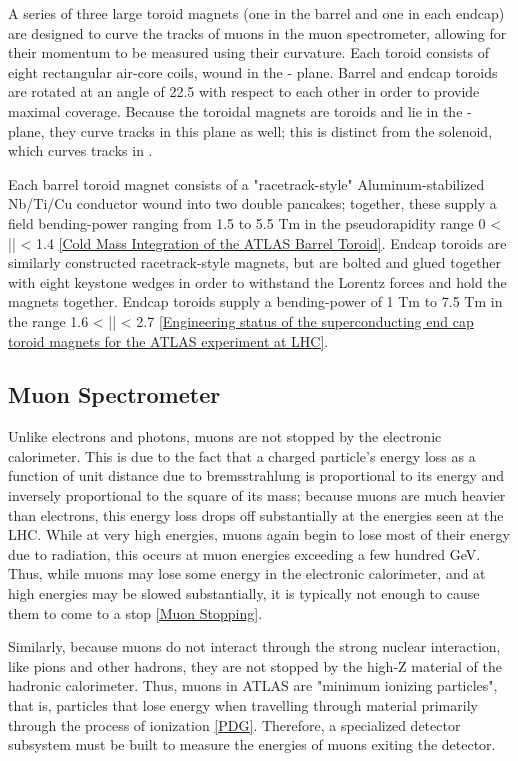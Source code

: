 A series of three large toroid magnets (one in the barrel and one in each endcap) are designed to curve the tracks of muons in the muon spectrometer, allowing for their momentum to be measured using their curvature. Each toroid consists of eight rectangular air-core coils, wound in the \R - \z plane. Barrel and endcap toroids are rotated at an angle of 22.5 \deg with respect to each other in order to provide maximal coverage. Because the toroidal magnets are toroids and lie in the \R - \z plane, they curve tracks in this plane as well; this is distinct from the solenoid, which curves tracks in \phi.

Each barrel toroid magnet consists of a "racetrack-style" Aluminum-stabilized Nb/Ti/Cu conductor wound into two double pancakes; together, these supply a field bending-power ranging from 1.5 to 5.5 Tm  in the pseudorapidity range  0 < |\eta | < 1.4 \ref{Cold Mass Integration of the ATLAS Barrel Toroid}. Endcap toroids are similarly constructed racetrack-style magnets, but are bolted and glued together with eight keystone wedges in order to withstand the Lorentz forces and hold the magnets together. Endcap toroids supply a bending-power of 1 Tm to 7.5 Tm in the range 1.6 < |\eta | < 2.7 \ref{Engineering status of the superconducting end cap toroid magnets for the ATLAS experiment at LHC}.

\subsection{Muon Spectrometer} \label{sec:Musyst}
 
Unlike electrons and photons, muons are not stopped by the electronic calorimeter. This is due to the fact that a charged particle's energy loss as a function of unit distance due to bremsstrahlung is proportional to its energy and inversely proportional to the square of its mass; because muons are much heavier than electrons, this energy loss drops off substantially at the energies seen at the LHC. While at very high energies, muons again begin to lose most of their energy due to radiation, this occurs at muon energies exceeding a few hundred GeV. Thus, while muons may lose some energy in the electronic calorimeter, and at high energies may be slowed substantially, it is typically not enough to cause them to come to a stop \ref{Muon Stopping}. 

Similarly, because muons do not interact through the strong nuclear interaction, like pions and other hadrons, they are not stopped by the high-Z material of the hadronic calorimeter. Thus, muons in ATLAS are "minimum ionizing particles", that is, particles that lose energy when travelling through material primarily through the process of ionization \ref{PDG}. Therefore, a specialized detector subsystem must be built to measure the energies of muons exiting the detector.

